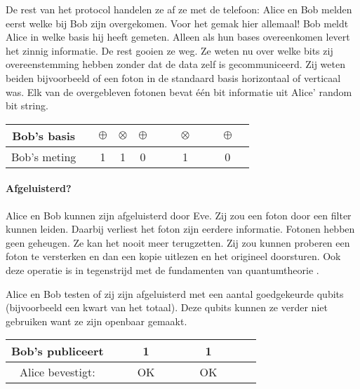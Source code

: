 \documentclass[../../main.tex]{subfiles}
\begin{document}
De rest van het protocol handelen ze af ze met de telefoon:
Alice en Bob melden eerst welke bij Bob zijn overgekomen. Voor het gemak hier allemaal! Bob meldt Alice in welke basis hij heeft gemeten. Alleen als hun bases overeenkomen levert het zinnig informatie. De rest gooien ze weg.
Ze weten nu over welke bits zij overeenstemming hebben zonder dat de data zelf is gecommuniceerd. Zij weten beiden bijvoorbeeld of een foton in de standaard basis horizontaal of verticaal was. Elk van de overgebleven fotonen bevat \'e\'en bit informatie uit Alice' random bit string.

\vspace*{12pt}
{\footnotesize
\begin{tabular}{c|c|c|c|c|c|c|c|c|c|c|c|}
Bob's basis & &$\oplus$&$\otimes$&$\oplus$& & &$\otimes$& & &$\oplus$\\\hline 
Bob's meting& &1&1&0& & &1& & &0
\end{tabular}
}


\paragraph{Afgeluisterd?}
Alice en Bob kunnen zijn afgeluisterd door Eve. Zij zou een foton door een filter kunnen leiden. Daarbij verliest het foton zijn eerdere informatie. Fotonen hebben geen geheugen. Ze kan het nooit meer terugzetten. Zij zou kunnen proberen een foton te versterken en dan een kopie uitlezen en het origineel doorsturen. Ook deze operatie is in tegenstrijd met de fundamenten van quantumtheorie \citep{wootters1982single}.
\iffalse
Gevolg is dat in geval ze afgeluisterd zijn \SI{50}{\percent} van de afgeluisterde fotonen de verkeerde informatie bevatten.
\fi
Alice en Bob testen of zij zijn afgeluisterd met een aantal goedgekeurde qubits (bijvoorbeeld een kwart van het totaal). Deze qubits kunnen ze verder niet gebruiken want ze zijn openbaar gemaakt.

\vspace*{12pt}
{\footnotesize
\begin{tabular}{c|c|c|c|c|c|c|c|c|c|c|}
Bob's publiceert  & & &1& & & &1& & & \\\hline 
Alice bevestigt:  & & &OK& & & &OK& & &
\end{tabular}
}
\vspace*{12pt}
\end{document}
